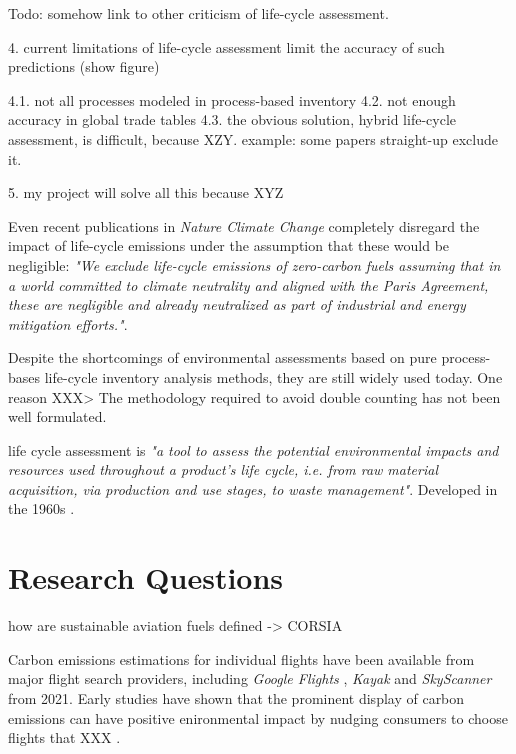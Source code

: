 \documentclass{article}
\begin{document}
    Todo: somehow link to other criticism of life-cycle assessment. 
    
    4. current limitations of life-cycle assessment limit the accuracy of such predictions (show figure)
    
        4.1. not all processes modeled in process-based inventory
        4.2. not enough accuracy in global trade tables
        4.3. the obvious solution, hybrid life-cycle assessment, is difficult, because XZY. example: some papers straight-up exclude it.
        
    5. my project will solve all this because XYZ

Even recent publications in \textit{Nature Climate Change} completely disregard the impact of life-cycle emissions under the assumption that these would be negligible: \textit{"We exclude life-cycle emissions of zero-carbon fuels assuming that in a world committed to climate neutrality and aligned with the Paris Agreement, these are negligible and already neutralized as part of industrial and energy mitigation efforts."}\cite{brazzola_definitions_2022}.

Despite the shortcomings of environmental assessments based on pure process-bases life-cycle inventory analysis methods, they are still widely used today. One reason XXX> The methodology required to avoid double counting has not been well formulated. 

    life cycle assessment is \textit{"a tool to assess the potential environmental impacts and resources used throughout a product’s life cycle, i.e. from raw material acquisition, via production and use stages, to waste management"}\cite{noauthor_iso_2006}. Developed in the 1960s \cite{hauschild_life_2018}. 
    
\section{Research Questions}
    
    how are sustainable aviation fuels defined -> CORSIA \cite{prussi_corsia_2021}

    Carbon emissions estimations for individual flights have been available from major flight search providers, including \textit{Google Flights} \cite{holden_google_2021}, \textit{Kayak} \cite{noauthor_kayak_2021} and \textit{SkyScanner} \cite{crosthwaite_how_2021} from 2021. Early studies have shown that the prominent display of carbon emissions can have positive enironmental impact by nudging consumers to choose flights that XXX \cite{amenta_adding_2020}\cite{sanguinetti_nudging_2022}.
    
\end{document}
